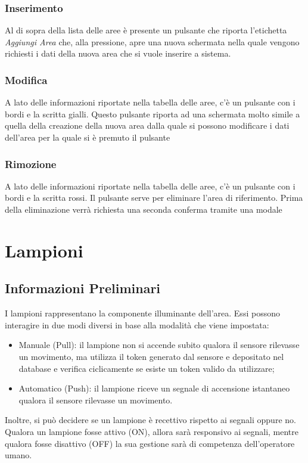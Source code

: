 \documentclass[a4paper, 12pt]{article}
\begin{document}
\subsubsection{Inserimento}
Al di sopra della lista delle aree è presente un pulsante che riporta l'etichetta \textit{Aggiungi Area} che, alla pressione, apre una nuova schermata nella quale vengono richiesti i dati della nuova area che si vuole inserire a sistema.

\subsubsection{Modifica}
A lato delle informazioni riportate nella tabella delle aree, c'è un pulsante con i bordi e la scritta gialli. Questo pulsante riporta ad una schermata molto simile a quella della creazione della nuova area dalla quale si possono modificare i dati dell'area per la quale si è premuto il pulsante

\subsubsection{Rimozione}
A lato delle informazioni riportate nella tabella delle aree, c'è un pulsante con i bordi e la scritta rossi. Il pulsante serve per eliminare l'area di riferimento. Prima della eliminazione verrà richiesta una seconda conferma tramite una modale

\newpage
\section{Lampioni}
\subsection{Informazioni Preliminari}
I lampioni rappresentano la componente illuminante dell'area. Essi possono interagire in due modi diversi in base alla modalità che viene impostata:
\begin{itemize}
    \item Manuale (Pull): il lampione non si accende subito qualora il sensore rilevasse un movimento, ma utilizza il token generato dal sensore e depositato nel database e verifica ciclicamente se esiste un token valido da utilizzare;
    \item Automatico (Push): il lampione riceve un segnale di accensione istantaneo qualora il sensore rilevasse un movimento.
\end{itemize}
Inoltre, si può decidere se un lampione è recettivo rispetto ai segnali oppure no. Qualora un lampione fosse attivo (ON), allora sarà responsivo ai segnali, mentre qualora fosse disattivo (OFF) la sua gestione sarà di competenza dell'operatore umano.
\end{document}
